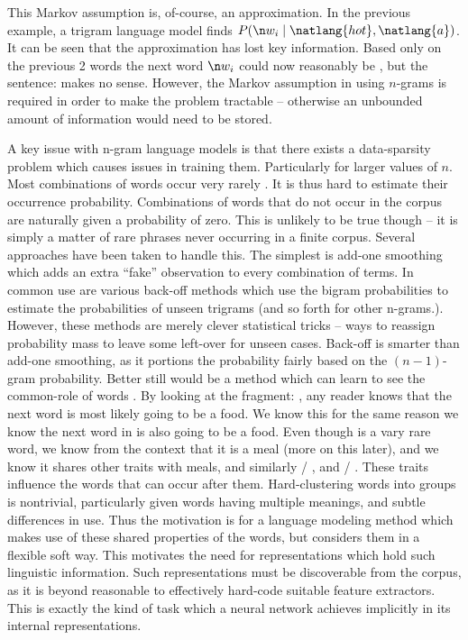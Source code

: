 {This Markov assumption is, of-course, an approximation.
In the previous example, a trigram language model finds $P(\n w_i \mid \natlang{hot}, \natlang{a})$.
It can be seen that the approximation has lost key information.
Based only on the previous 2 words the next word $\n w_i$ could now reasonably be , but the sentence:  makes no sense.
However, the Markov assumption in using $n$-grams is required in order to make the problem tractable -- otherwise an unbounded amount of information would need to be stored. 

A key issue with n-gram language models is that there exists a data-sparsity problem which causes issues in training them.
Particularly for larger values of $n$.
Most combinations of words occur very rarely .
It is thus hard to estimate their occurrence probability.
Combinations of words that do not occur in the corpus are naturally given a probability of zero.
This is unlikely to be true though -- it is simply a matter of rare phrases never occurring in a finite corpus.
Several approaches have been taken to handle this.
The simplest is add-one smoothing which adds an extra ``fake'' observation to every combination of terms.
In common use are various back-off methods  which use the bigram probabilities to estimate the probabilities of unseen trigrams (and so forth for other n-grams.).
%
%
However, these methods are merely clever statistical tricks -- ways to reassign probability mass  to leave some left-over for unseen cases.
Back-off is smarter than add-one smoothing, as it portions the probability fairly based on the $(n{-}1)$-gram probability.
Better still would be a method which can learn to see the common-role of words .
By looking at the fragment: , any reader knows that the next word is most likely going to be a food.
We know this for the same reason we know the next word in  is also going to be a food.
Even though  is a vary rare word, we know from the context that it is a meal (more on this later), and we know it shares other traits with meals, and similarly  / , and  / .
These traits influence the words that can occur after them.
Hard-clustering words into groups is nontrivial, particularly given words having multiple meanings, and subtle differences in use.
Thus the motivation is for a language modeling method which makes use of these shared properties of the words, but considers them in a flexible soft way.
This motivates the need for representations which hold such linguistic information.
Such representations must be discoverable from the corpus, as it is beyond reasonable to effectively hard-code suitable feature extractors.
This is exactly the kind of task which a neural network achieves implicitly in its internal representations.


}
